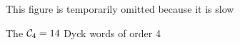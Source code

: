 \begin{figure}[H]
    \centering
    This figure is temporarily omitted because it is slow
    \caption{The $\mathcal{C}_4=14$ Dyck words of order 4}
    \label{fig:Dycks}
\end{figure}




